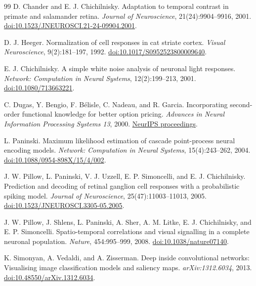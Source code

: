 \documentclass[UTF8,12pt,a4paper]{ctexart}
\numberwithin{equation}{section}
\begin{document}
\begin{thebibliography}{99}
D. Chander and E. J. Chichilnisky.
Adaptation to temporal contrast in primate and salamander retina.
\emph{Journal of Neuroscience}, 21(24):9904--9916, 2001.
\href{https://doi.org/10.1523/JNEUROSCI.21-24-09904.2001}{doi:10.1523/JNEUROSCI.21-24-09904.2001}.

D. J. Heeger.
Normalization of cell responses in cat striate cortex.
\emph{Visual Neuroscience}, 9(2):181--197, 1992.
\href{https://doi.org/10.1017/S0952523800009640}{doi:10.1017/S0952523800009640}.

E. J. Chichilnisky.
A simple white noise analysis of neuronal light responses.
\emph{Network: Computation in Neural Systems}, 12(2):199--213, 2001.
\href{https://doi.org/10.1080/713663221}{doi:10.1080/713663221}.

C. Dugas, Y. Bengio, F. B\'elisle, C. Nadeau, and R. Garcia.
Incorporating second-order functional knowledge for better option pricing.
\emph{Advances in Neural Information Processing Systems 13}, 2000.
\href{https://proceedings.neurips.cc/paper/2000/hash/44968aece94f667e4095002d140b5896-Abstract.html}{NeurIPS proceedings}.

L. Paninski.
Maximum likelihood estimation of cascade point-process neural encoding models.
\emph{Network: Computation in Neural Systems}, 15(4):243--262, 2004.
\href{https://doi.org/10.1088/0954-898X/15/4/002}{doi:10.1088/0954-898X/15/4/002}.

J. W. Pillow, L. Paninski, V. J. Uzzell, E. P. Simoncelli, and E. J. Chichilnisky.
Prediction and decoding of retinal ganglion cell responses with a probabilistic spiking model.
\emph{Journal of Neuroscience}, 25(47):11003--11013, 2005.
\href{https://doi.org/10.1523/JNEUROSCI.3305-05.2005}{doi:10.1523/JNEUROSCI.3305-05.2005}.

J. W. Pillow, J. Shlens, L. Paninski, A. Sher, A. M. Litke, E. J. Chichilnisky, and E. P. Simoncelli.
Spatio-temporal correlations and visual signalling in a complete neuronal population.
\emph{Nature}, 454:995--999, 2008.
\href{https://doi.org/10.1038/nature07140}{doi:10.1038/nature07140}.

K. Simonyan, A. Vedaldi, and A. Zisserman.
Deep inside convolutional networks: Visualising image classification models and saliency maps.
\emph{arXiv:1312.6034}, 2013.
\href{https://doi.org/10.48550/arXiv.1312.6034}{doi:10.48550/arXiv.1312.6034}.


\end{thebibliography}
\end{document}
